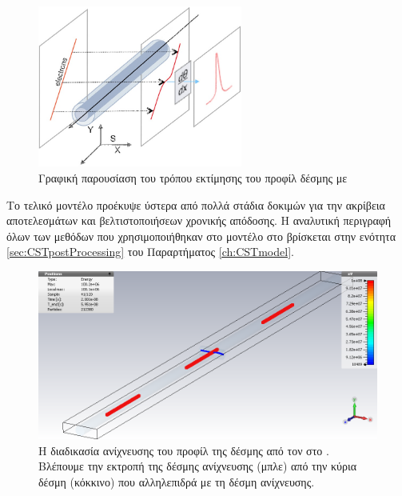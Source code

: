 \begin{figure}[tph]
\includegraphics[width=0.6\textwidth]{figures/EBS-profile-calculation}
\centering
\caption{Γραφική παρουσίαση του τρόπου εκτίμησης του προφίλ δέσμης με  \cite{Blokland2009}}
\label{fig:EBS-profile-calculation}
\end{figure}

Το τελικό μοντέλο προέκυψε ύστερα από πολλά στάδια δοκιμών για την ακρίβεια αποτελεσμάτων και βελτιστοποιήσεων χρονικής απόδοσης.
Η αναλυτική περιγραφή όλων των μεθόδων  που χρησιμοποιήθηκαν στο μοντέλο στο  βρίσκεται στην ενότητα \ref{sec:CSTpostProcessing} του Παραρτήματος \ref{ch:CSTmodel}.

\begin{figure}[tbh]
\includegraphics[width=\textwidth]{figures/CST-EBS-implementation/CST-multi-bunch-EBS-detection}
\centering
\caption[Η διαδικασία ανίχνευσης του προφίλ της δέσμης από τον  στο ]
{Η διαδικασία ανίχνευσης του προφίλ της δέσμης από τον  στο .
Βλέπουμε την εκτροπή της δέσμης ανίχνευσης (μπλε) από την κύρια δέσμη (κόκκινο) που αλληλεπιδρά με τη δέσμη ανίχνευσης.}
\label{fig:CST-MultiBunchEBSDetection}
\end{figure}

